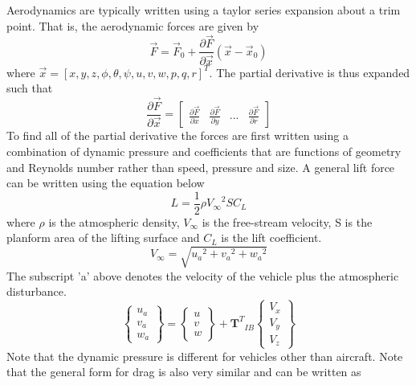 Aerodynamics are typically written using a taylor series expansion
about a trim point\cite{phil}\cite{AndersonD}. That is, the aerodynamic forces are given by
\begin{equation}
\vec{F} = \vec{F}_0 + \frac{\partial \vec{F}}{\partial \vec{x}}(\vec{x}-\vec{x}_0)
\end{equation}
where $\vec{x} = [x,y,z,\phi,\theta,\psi,u,v,w,p,q,r]^T$. The partial
derivative is thus expanded such that
\begin{equation}
\frac{\partial \vec{F}}{\partial \vec{x}} = \begin{bmatrix} \frac{\partial
    \vec{F}}{\partial x} & \frac{\partial \vec{F}}{\partial y} & ... &
  \frac{\partial \vec{F}}{\partial r} \end{bmatrix}
\end{equation}
To find all of the partial derivative the forces are first written
using a combination of dynamic pressure and coefficients that are
functions of geometry and Reynolds number rather than speed, pressure
and size. A general lift force can be written using the equation below
\begin{equation}
L = \frac{1}2\rho {V_{\infty}}^2 S C_L
\end{equation}
where $\rho$ is the atmospheric density, $V_{\infty}$ is the
free-stream velocity, S is the planform area of the lifting surface and $C_L$ is
the lift coefficient. 
\begin{equation}\label{e:vtotal}
  V_{\infty} = \sqrt{{u_a}^2 + {v_a}^2 + {w_a}^2}
\end{equation}
The subscript 'a' above denotes the velocity of the vehicle plus the
atmospheric disturbance. 
\begin{equation}\label{e:atm}
\begin{Bmatrix} u_a \\ v_a \\ w_a \end{Bmatrix} =
\begin{Bmatrix} u \\ v \\ w \end{Bmatrix} +
{\textbf{T}^T}_{IB} \begin{Bmatrix}
 V_x \\ V_y \\ V_z \end{Bmatrix}
\end{equation}
Note that the dynamic pressure is different for vehicles other than aircraft. Note that the general form for drag is also very similar and can be written as

